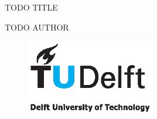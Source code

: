 \begin{titlepage}

\null\vfill

\begin{center}
\LARGE{TODO TITLE}
\end{center}

\vspace{1.5cm}

\begin{center}
TODO AUTHOR
\end{center}

\vfill

\begin{figure}[!b]
\centering
\includegraphics[width={0.5\textwidth}]{pics/TUD_logo_color.eps}
\end{figure}

\vspace{2.0cm}

\end{titlepage}


